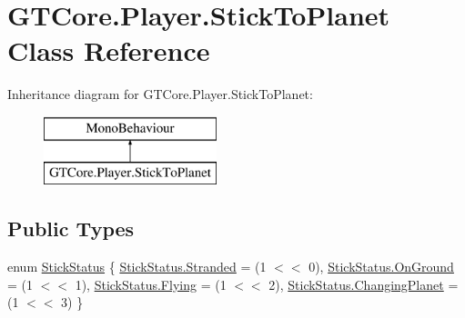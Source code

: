 \hypertarget{class_g_t_core_1_1_player_1_1_stick_to_planet}{}\section{G\+T\+Core.\+Player.\+Stick\+To\+Planet Class Reference}
\label{class_g_t_core_1_1_player_1_1_stick_to_planet}
Inheritance diagram for G\+T\+Core.\+Player.\+Stick\+To\+Planet\+:\begin{figure}[H]
\begin{center}
\leavevmode
\includegraphics[height=2.000000cm]{class_g_t_core_1_1_player_1_1_stick_to_planet}
\end{center}
\end{figure}
\subsection*{Public Types}
\begin{DoxyCompactItemize}
\item 
enum \hyperlink{class_g_t_core_1_1_player_1_1_stick_to_planet_ab080d35c69764b3967026265d41fff67}{Stick\+Status} \{ \hyperlink{class_g_t_core_1_1_player_1_1_stick_to_planet_ab080d35c69764b3967026265d41fff67a0b39370ea87ef482a4def72565f537a4}{Stick\+Status.\+Stranded} = (1 $<$$<$ 0), 
\hyperlink{class_g_t_core_1_1_player_1_1_stick_to_planet_ab080d35c69764b3967026265d41fff67a2b9beed57034f5727573d7ded76cf777}{Stick\+Status.\+On\+Ground} = (1 $<$$<$ 1), 
\hyperlink{class_g_t_core_1_1_player_1_1_stick_to_planet_ab080d35c69764b3967026265d41fff67a444733081a578880ba8a563d3c59d22d}{Stick\+Status.\+Flying} = (1 $<$$<$ 2), 
\hyperlink{class_g_t_core_1_1_player_1_1_stick_to_planet_ab080d35c69764b3967026265d41fff67ad1fffb0bbc691ac077c60bd99284a005}{Stick\+Status.\+Changing\+Planet} = (1 $<$$<$ 3)
 \}
\end{DoxyCompactItemize}
